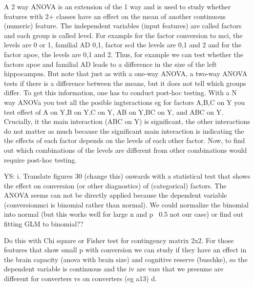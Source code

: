 \documentclass[11pt]{article}
\theoremstyle{definition}
\theoremstyle{remark}
\begin{document}
A 2 way ANOVA is an extension of the 1 way and is used to study whether features with 2+ classes have an effect on the mean of another continuous (numeric) feature. The independent variables (input features) are called factors and each group is called level.
For example for the factor conversion to mci, the levels are 0 or 1, familial AD 0,1, factor scd the levels are 0,1 and 2 and for the factor apoe, the levels are 0,1 and 2. Thus, for example we can test whether the factors apoe and familial AD leads to a difference in the size of the left hippocampus.
But note that just as with a one-way ANOVA, a two-way ANOVA tests if there is a difference between the means, but it does not tell which groups differ. To get this information, one has to conduct post-hoc testing.
With a N way ANOVa you test all the posible ingteractions eg for factors A,B,C on Y you test effect of A on Y,B on Y,C on Y, AB on Y,BC on Y, and ABC on Y.
Crucially, it the main interaction (ABC on Y) is significant, the other interactions do not matter as much because the significant main interaction is indicating the the effects of each factor depends on the levels of each other factor. Now, to find out which combinations of the levels are different from other combinations would require post-hoc testing.    


YS: i. Translate figures 30 (change this) onwards with a statistical test that shows the effect on conversion (or other diagnostics) of (categorical) factors. The ANOVA seems can not be directly applied because the dependent variable (conversionmci is binomial rather than normal). We could normalize the binomial into normal (but this works well for large n and p ~0.5 not our case) or find out fitting GLM to binomial?? 

Do this with Chi square or Fisher test for contingency matrix 2x2. For those features that show small p with conversion we can study if they have an effect in the brain capacity (anova with brain size) and cognitive reserve (buschke), so the dependent variable is continuous and the iv are vars that we presume are different for converters vs on converters (eg a13) d.
\end{document}
